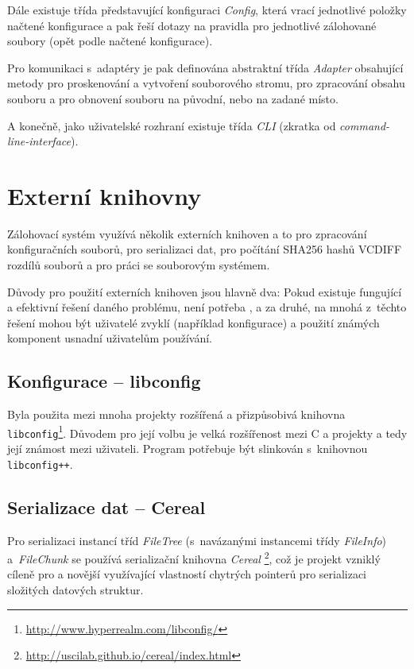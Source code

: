 Dále existuje třída představující konfiguraci {\it Config}, která vrací
jednotlivé položky načtené konfigurace a pak řeší dotazy na pravidla pro
jednotlivé zálohované soubory (opět podle načtené konfigurace).

Pro komunikaci s~adaptéry je pak definována abstraktní třída {\it Adapter}
obsahující metody pro proskenování a vytvoření souborového stromu, pro
zpracování obsahu souboru a pro obnovení souboru na původní, nebo na zadané
místo.

A konečně, jako uživatelské rozhraní existuje třída {\it CLI} (zkratka od
{\it command-line-interface}).

\section{Externí knihovny}

Zálohovací systém využívá několik externích knihoven a to pro zpracování
konfiguračních souborů, pro serializaci dat, pro počítání \gls{SHA256} hashů
\gls{VCDIFF} rozdílů souborů a pro práci se souborovým systémem.

Důvody pro použití externích knihoven jsou hlavně dva: Pokud existuje fungující
a efektivní řešení daného problému, není potřeba , a za
druhé, na mnohá z~těchto řešení mohou být uživatelé zvyklí (například konfigurace)
a použití známých komponent usnadní uživatelům používání.

\subsection*{Konfigurace -- libconfig}

Byla použita mezi mnoha projekty rozšířená a přizpůsobivá knihovna
\texttt{libconfig}\footnote{\url{http://www.hyperrealm.com/libconfig/}}. Důvodem
pro její volbu je velká rozšířenost mezi C a \Cpp projekty a tedy její známost
mezi uživateli. Program potřebuje být slinkován s~knihovnou
\texttt{libconfig++}.

\subsection*{Serializace dat -- Cereal}

Pro serializaci instancí tříd {\it FileTree} (s~navázanými instancemi třídy
{\it FileInfo}) a~{\it FileChunk} se používá serializační knihovna {\it Cereal}%
\footnote{\url{http://uscilab.github.io/cereal/index.html}}, což je projekt
vzniklý cíleně pro  a novější využívající vlastností chytrých
pointerů pro serializaci složitých datových struktur.

